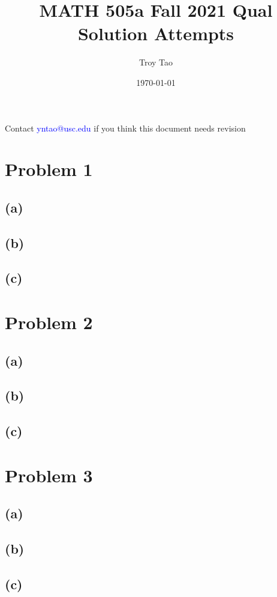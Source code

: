 \documentclass{article}
\title{MATH 505a Fall 2021 Qual Solution Attempts}
\author{Troy Tao}
\date\today
\begin{document}
\maketitle 
Contact \textcolor{blue}{yntao@usc.edu} if you think this document needs revision


\section*{Problem 1}

\subsection*{(a)}

\color{blue}

\color{black}
\subsection*{(b)}

\color{blue}

\color{black}
\subsection*{(c)}

\color{blue}

\color{black}
\section*{Problem 2}

\subsection*{(a)}

\color{blue}

\color{black}
\subsection*{(b)}

\color{blue}

\color{black}
\subsection*{(c)}

\color{blue}

\color{black}
\section*{Problem 3}

\subsection*{(a)}

\color{blue}

\color{black}
\subsection*{(b)}

\color{blue}

\color{black}
\subsection*{(c)}

\color{blue}
\end{document}
